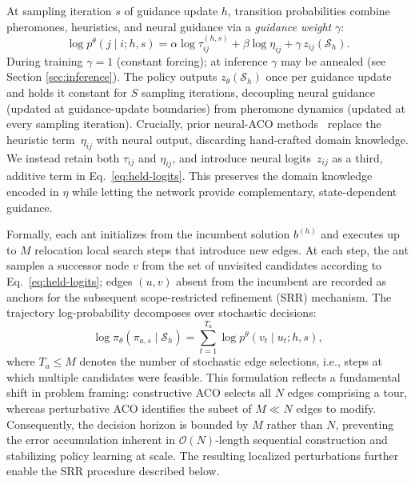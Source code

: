 \documentclass[sigconf]{acmart}
\begin{document}
At sampling iteration $s$ of guidance update $h$, transition probabilities combine pheromones, heuristics, and neural guidance via a \emph{guidance weight} $\gamma$:
\begin{equation}
\log p^\theta(j \mid i; h, s) = \alpha \log \tau^{(h,s)}_{ij} + \beta \log \eta_{ij} + \gamma\, z_{ij}(\mathcal{S}_h).
\label{eq:held-logits}
\end{equation}
During training $\gamma{=}1$ (constant forcing); at inference $\gamma$ may be annealed (see Section \ref{sec:inference}). The policy outputs $z_\theta(\mathcal{S}_h)$ once per guidance update and holds it constant for $S$ sampling iterations, decoupling neural guidance (updated at guidance-update boundaries) from pheromone dynamics (updated at every sampling iteration). Crucially, prior neural-ACO methods~\cite{deepaco,gfacs,gtgaco} replace the heuristic term~$\eta_{ij}$ with neural output, discarding hand-crafted domain knowledge. We instead retain both $\tau_{ij}$ and $\eta_{ij}$, and introduce neural logits~$z_{ij}$ as a third, additive term in Eq.~\eqref{eq:held-logits}. This preserves the domain knowledge encoded in $\eta$ while letting the network provide complementary, state-dependent guidance.

Formally, each ant initializes from the incumbent solution $b^{(h)}$ and executes up to $M$ relocation local search steps that introduce new edges. At each step, the ant samples a successor node $v$ from the set of unvisited candidates according to Eq.~\eqref{eq:held-logits}; edges $(u,v)$ absent from the incumbent are recorded as anchors for the subsequent scope-restricted refinement (SRR) mechanism. The trajectory log-probability decomposes over stochastic decisions:
\begin{equation}
\log \pi_\theta(\pi_{a,s} \mid \mathcal{S}_h) = \sum_{t=1}^{T_a} \log p^\theta(v_t \mid u_t; h, s),
\label{eq:logp-trajectory}
\end{equation}
where $T_a \le M$ denotes the number of stochastic edge selections, i.e., steps at which multiple candidates were feasible. This formulation reflects a fundamental shift in problem framing: constructive ACO selects all $N$ edges comprising a tour, whereas perturbative ACO identifies the subset of $M \ll N$ edges to modify. Consequently, the decision horizon is bounded by $M$ rather than $N$, preventing the error accumulation inherent in $\mathcal{O}(N)$-length sequential construction and stabilizing policy learning at scale. The resulting localized perturbations further enable the SRR procedure described below.
\end{document}
